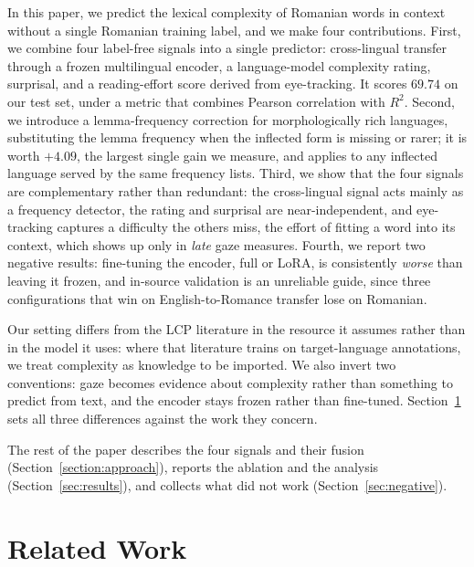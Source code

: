 In this paper, we predict the lexical complexity of Romanian words in
context without a single Romanian training label, and we make four
contributions. First, we combine four label-free signals into a single
predictor: cross-lingual transfer through a frozen multilingual encoder,
a language-model complexity rating, surprisal, and a reading-effort
score derived from eye-tracking. It scores $69.74$ on our test set,
under a metric that combines Pearson correlation with $R^2$.
Second, we introduce a lemma-frequency correction for
morphologically rich languages, substituting the lemma frequency when the
inflected form is missing or rarer; it is worth $+4.09$, the largest
single gain we measure, and applies to any inflected language served
by the same frequency lists. Third, we show that the four signals are
complementary rather than redundant: the cross-lingual signal acts mainly
as a frequency detector, the rating and surprisal are near-independent,
and eye-tracking captures a difficulty the others miss, the effort of
fitting a word into its context, which shows up only in \emph{late} gaze
measures.
Fourth, we report two negative results: fine-tuning the encoder, full or
LoRA, is consistently \emph{worse} than leaving it frozen, and in-source
validation is an unreliable guide, since three configurations that win on
English-to-Romance transfer lose on Romanian.

Our setting differs from the LCP literature in the resource it assumes
rather than in the model it uses: where that literature trains on
target-language annotations, we treat complexity as knowledge to be
imported. We also invert two conventions: gaze becomes evidence about
complexity rather than something to predict from text, and the encoder
stays frozen rather than fine-tuned. Section~\ref{sec:related} sets all
three differences against the work they concern.

The rest of the paper describes the four signals and their fusion
(Section~\ref{section:approach}), reports the ablation and the analysis
(Section~\ref{sec:results}), and collects what did not work
(Section~\ref{sec:negative}).

\section{Related Work}
\label{sec:related}

